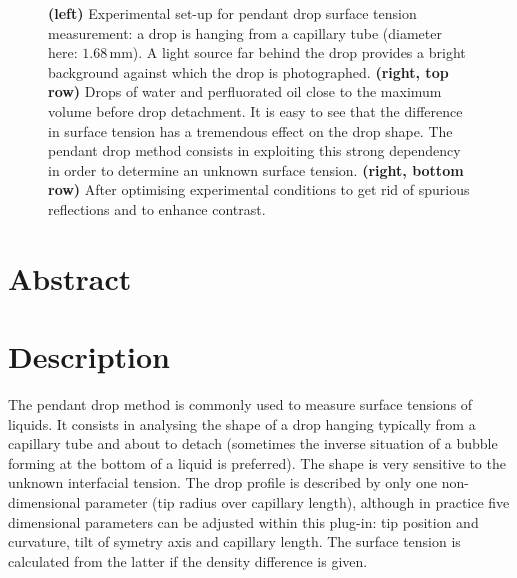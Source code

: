 \documentclass[fleqn]{scrartcl}
\newcommand{\gouttependante}{\texttt{Goutte\_pendante}\xspace}
\begin{document}
\begin{figure}
{}
\caption{\textbf{(left)} Experimental set-up for pendant drop surface
  tension measurement: a drop is hanging from a capillary tube
  (diameter here: $1.68\,$mm). A light source far behind the drop
  provides a bright background against which the drop is photographed.
  \textbf{(right, top row)} Drops of water and perfluorated oil close
  to the maximum volume before drop detachment. It is easy to see that
  the difference in surface tension has a tremendous effect on the
  drop shape. The pendant drop method consists in exploiting this
  strong dependency in order to determine an unknown surface tension.
  \textbf{(right, bottom row)} After optimising experimental
  conditions to get rid of spurious reflections and to enhance
  contrast.}
\label{fig:pendantdropphoto}
\end{figure}

\section*{Abstract}
\label{sec:abstract}

\begin{abstract}
  The pendant drop method for surface tension measurement consists in
  analysing the shape of a drop hanging from a capillary tube
  (Fig.~\ref{fig:pendantdropphoto}). The \gouttependante plug-in for
  \href{http://imagej.nih.gov/ij/}{ImageJ}~\cite{ImageJ} provides a
  tool to match a theoretical profile to the contour of a pendant
  drop, either interactively or automatically. The surface tension can
  then be easily calculated from the best matching parameters.
  Section~\ref{sec:description} describes the plug-in functionality,
  section~\ref{sec:prerequisites} lists the properties that the input
  image must have for the plug-in to give meaningful results. Sections
  \ref{sec:installation} and \ref{sec:usage} explain the installation
  and the usage of the plug-in. Finally sections~\ref{sec:theory} and
  \ref{sec:numerics} describe the underlying theoretical framework and
  the plugin's inner workings, respectively.
\end{abstract}


\section{Description}
\label{sec:description}

The pendant drop method is commonly used to measure surface tensions
of liquids. It consists in analysing the shape of a drop hanging
typically from a capillary tube and about to detach (sometimes the
inverse situation of a bubble forming at the bottom of a liquid is
preferred). The shape is very sensitive to the unknown interfacial
tension. The drop profile is described by only one non-dimensional
parameter (tip radius over capillary length), although in practice
five dimensional parameters can be adjusted within this plug-in: tip
position and curvature, tilt of symetry axis and capillary length. The
surface tension is calculated from the latter if the density
difference is given.
\end{document}

